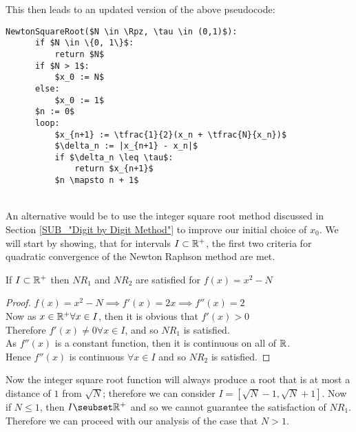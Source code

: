 This then leads to an updated version of the above pseudocode:\\

\label{PCD_"Newton Square Root v1"}
\begin{lstlisting}[frame=single,mathescape,caption={Basic Newton Method for Square Root}]
  NewtonSquareRoot($N \in \Rpz, \tau \in (0,1)$):
      if $N \in \{0, 1\}$:
          return $N$
      if $N > 1$:
          $x_0 := N$
      else:
          $x_0 := 1$
      $n := 0$
      loop:
          $x_{n+1} := \tfrac{1}{2}(x_n + \tfrac{N}{x_n})$
          $\delta_n := |x_{n+1} - x_n|$
          if $\delta_n \leq \tau$:
              return $x_{n+1}$
          $n \mapsto n + 1$
\end{lstlisting}

\\

An alternative would be to use the integer square root method discussed in Section \ref{SUB_"Digit by Digit Method"} to improve our initial choice of \(x_0\). We will start by showing, that for intervals \(I \subset \mathbb{R}^+\), the first two criteria for quadratic convergence of the Newton Raphson method are met.

\begin{SRNM NR1 and NR2}
\label{THM_"SRNM NR1 and NR2}
If \(I \subset \mathbb{R}^+\) then \(NR_1\) and \(NR_2\) are satisfied for \(f(x) = x^2 - N\)
\end{SRNM NR1 and NR2}

\begin{proof}
\(f(x) = x^2 - N \implies f'(x) = 2x \implies f''(x) = 2\)\\
Now as \(x \in \mathbb{R}^+ \forall x \in I\), then it is obvious that \(f'(x) > 0\)\\
Therefore \(f'(x) \neq 0 \forall x \in I\), and so \(NR_1\) is satisfied.\\
As \(f''(x)\) is a constant function, then it is continuous on all of \(\mathbb{R}\).\\
Hence \(f''(x)\) is continuous \(\forall x \in I\) and so \(NR_2\) is satisfied.
\end{proof}

Now the integer square root function will always produce a root that is at most a distance of \(1\) from \(\sqrt{N}\); therefore we can consider \(I = [\sqrt{N} - 1, \sqrt{N} + 1]\). Now if \(N \le 1\), then \(I \seubset \Rp\) and so we cannot guarantee the satisfaction of \(NR_1\). Therefore we can proceed with our analysis of the case that \(N > 1\).\\


